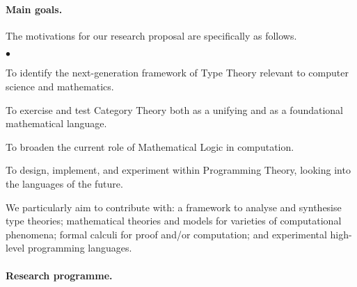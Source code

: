 \documentclass[11pt,twocolumn]{article}
\newenvironment{myitemize}
  {\begin{list}{$\bullet$}
  {\setlength{\topsep}{1pt}
   \setlength{\partopsep}{1pt}
   \setlength{\itemsep}{0pt}
   \setlength{\parsep}{0pt}
   \setlength{\leftmargin}{1em}
   \setlength{\labelwidth}{.5em}}}
  {\end{list}}
\begin{document}
\paragraph*{Main goals.}

The motivations for our research proposal are specifically as follows. 
\begin{myitemize}
\item[\raisebox{.75mm}{\tiny$\bigstar$}]\hspace*{-2mm}
  To identify the next-generation framework of Type Theory relevant to
  computer science and mathematics.
\item[\raisebox{.75mm}{\tiny$\bigstar$}]\hspace*{-2mm}
  To exercise and test Category Theory both as a unifying and as a
  foundational mathematical language.
\item[\raisebox{.75mm}{\tiny$\bigstar$}]\hspace*{-2mm}
  To broaden the current role of Mathematical Logic in computation.
\item[\raisebox{.75mm}{\tiny$\bigstar$}]\hspace*{-2mm}
  To design, implement, and experiment within Programming Theory, looking
  into the languages of the future.
\end{myitemize}

We particularly aim to contribute with: a framework to analyse and synthesise
type theories; mathematical theories and models for varieties of computational
phenomena; formal calculi for proof and/or computation; and experimental
high-level programming languages.

\paragraph*{Research programme.}
\end{document}
